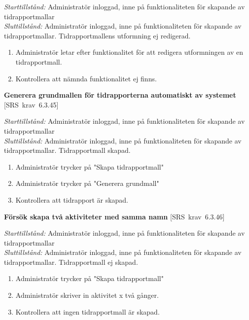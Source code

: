 \documentclass[a4paper]{article}
\def\reqinside{\hfil\penalty 100 \hfilneg \hbox}
\def \req [#1]{\reqinside{[SRS krav #1]}}
\begin{document}
\begin{FT}
\emph{Starttillstånd:} Administratör inloggad, inne på funktionaliteten för skapande av tidrapportmallar\\
\emph{Sluttillstånd:} Administratör inloggad, inne på funktionaliteten för skapande av tidrapportmallar. Tidrapportmallens utformning ej redigerad.\\

\begin{enumerate}
\item Administratör letar efter funktionalitet för att redigera utformningen av en tidrapportmall.
\item Kontrollera att nämnda funktionalitet ej finns.
\end{enumerate}



\item
\textbf{Generera grundmallen för tidrapporterna automatiskt av systemet} \req[6.3.45]

\emph{Starttillstånd:} Administratör inloggad, inne på funktionaliteten för skapande av tidrapportmallar\\
\emph{Sluttillstånd:} Administratör inloggad, inne på funktionaliteten för skapande av tidrapportmallar. Tidrapportmall skapad.\\

\begin{enumerate}
\item Administratör trycker på "Skapa tidrapportmall"
\item Administratör trycker på "Generera grundmall"
\item Kontrollera att tidrapport är skapad.
\end{enumerate}


\item
\textbf{Försök skapa två aktiviteter med samma namn} \req[6.3.46]

\emph{Starttillstånd:} Administratör inloggad, inne på funktionaliteten för skapande av tidrapportmallar\\
\emph{Sluttillstånd:} Administratör inloggad, inne på funktionaliteten för skapande av tidrapportmallar. Tidrapportmall ej skapad.\\

\begin{enumerate}
\item Administratör trycker på "Skapa tidrapportmall"
\item Administratör skriver in aktivitet x två gånger.
\item Kontrollera att ingen tidrapportmall är skapad.
\end{enumerate}



\end{FT}
\end{document}
